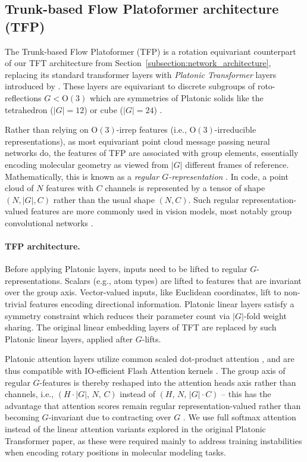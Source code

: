 \documentclass{article}
\theoremstyle{plain}
\theoremstyle{definition}
\theoremstyle{remark}
\begin{document}
\subsection{Trunk-based Flow Platoformer architecture (TFP)}
\label{appendix:tfp_model}

The Trunk-based Flow Platoformer (TFP) is a rotation equivariant counterpart of our TFT architecture from Section~\ref{subsection:network_architecture},
replacing its standard transformer layers with \emph{Platonic Transformer} layers introduced by \citet{islam2025platonic}. These layers are equivariant to discrete subgroups of roto-reflections $G<\mathrm{O}(3)$ which are symmetries of Platonic solids like the tetrahedron ($|G|=12$) or cube ($|G|=24$) \citep{cesa2021ENsteerable}.

Rather than relying on $\mathrm{O}(3)$-irrep features (i.e., $\mathrm{O}(3)$-irreducible representations), as most equivariant point cloud message passing neural networks do, the features of TFP are associated with group elements, essentially encoding molecular geometry as viewed from $|G|$ different frames of reference. Mathematically, this is known as a \emph{regular $G$-representation} \citep{weiler2025EquivCoordIndepCNNsWS}. In code, a point cloud of $N$ features with $C$ channels is represented by a tensor of shape $(N,|G|,C)$ rather than the usual shape $(N,C)$. Such regular representation-valued features are more commonly used in vision models, most notably group convolutional networks \citep{Cohen2016-GCNN,Weiler2018SFCNN,bekkers2018roto}.

\paragraph{TFP architecture.}
Before applying Platonic layers, inputs need to be lifted to regular $G$-representations.
Scalars (e.g., atom types) are lifted to features that are invariant over the group axis.
Vector-valued inputs, like Euclidean coordinates, lift to non-trivial features encoding directional information. Platonic linear layers satisfy a symmetry constraint
which reduces their parameter count via $|G|$-fold weight sharing. The original linear embedding layers of TFT are replaced by such Platonic linear layers, applied after $G$-lifts.

Platonic attention layers utilize common scaled dot-product attention \citep{vaswani2017attention}, and are thus compatible with IO-efficient Flash Attention kernels \citep{dao2024flashattention}. The group axis of regular $G$-features is thereby reshaped into the attention heads axis rather than channels, i.e., ${(H\!\cdot\!|G|,\, N,\, C)}$ instead of ${(H,\, N,\, |G|\!\cdot\!C)}$ -- this has the advantage that attention scores remain regular representation-valued rather than becoming $G$-invariant due to contracting over $G$ \citep{islam2025platonic}. We use full softmax attention instead of the linear attention variants explored in the original Platonic Transformer paper, as these were required mainly to address training instabilities when encoding rotary positions in molecular modeling tasks.
\end{document}
